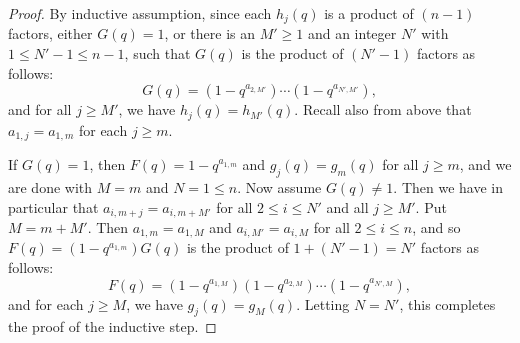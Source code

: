 \documentclass[10pt,a4paper]{amsart}
\begin{document}
\begin{proof}
	
	By inductive assumption, since each $h_j(q)$ is a product of $(n-1)$ factors, either $G(q) = 1$, or there is an $M' \geq 1$ and an integer $N'$ with $1 \leq N' -1 \leq n-1$, such that $G(q)$ is the product of $(N' - 1)$ factors as follows:
	\[
	G(q) 
	=
	(1 - q^{a_{2,M'}})
	\cdots
	(1 - q^{a_{N',M'}}),
	\]
	and for all $j \geq M'$, we have $h_j(q) = h_{M'}(q)$. Recall also from above that $a_{1,j} = a_{1,m}$ for each $j \geq m$. 
	
	If $G(q) = 1$, then $F(q) = 1 - q^{a_{1,m}}$ and $g_j(q) = g_m(q)$ for all $j \geq m$, and we are done with $M = m$ and $N = 1 \leq n$. Now assume $G(q) \neq 1$. Then we have in particular that $a_{i,m+j} = a_{i,m+M'}$ for all $2 \leq i \leq N'$ and all $j \geq M'$.  Put $M = m + M'$. Then $a_{1,m} = a_{1,M}$ and $a_{i,M'} = a_{i,M}$ for all $2 \leq i \leq n$, and so $F(q) = (1 - q^{a_{1,m}})G(q)$ is the product of $1 + (N'-1) = N'$ factors as follows:
	\[
	F(q)
	=
	(1-q^{a_{1,M}})
	(1 - q^{a_{2,M}})
	\cdots
	(1 - q^{a_{N',M}}),
	\]
	and for each $j \geq M$, we have $g_j(q) = g_M(q)$. Letting $N = N'$, this completes the proof of the inductive step.
\end{proof}
\end{document}
